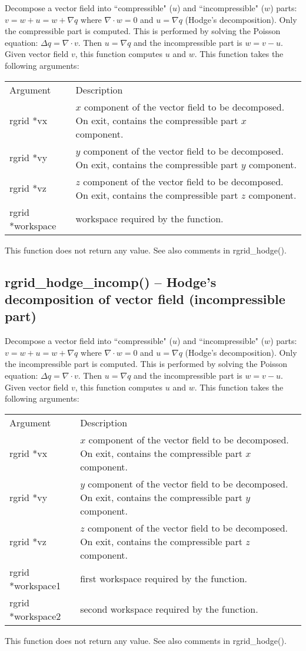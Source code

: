 \documentclass[12pt,letterpaper]{report}
\begin{document}
Decompose a vector field into ``compressible" ($u$) and ``incompressible" ($w$) parts: $v = w + u = w + \nabla q$ where $\nabla\cdot w = 0$ and $u = \nabla q$ (Hodge's decomposition). Only the compressible part is computed. This is performed by solving the Poisson equation: $\Delta q = \nabla\cdot v$. Then $u = \nabla q$ and the incompressible part is $w = v - u$. Given vector field $v$, this function computes $u$ and $w$. This function takes the following arguments:
\begin{longtable}{p{} p{}}
Argument & Description\\
\cline{1-2}
rgrid *vx & $x$ component of the vector field to be decomposed. On exit, contains the compressible part $x$ component.\\
rgrid *vy & $y$ component of the vector field to be decomposed. On exit, contains the compressible part $y$ component.\\
rgrid *vz & $z$ component of the vector field to be decomposed. On exit, contains the compressible part $z$ component.\\
rgrid *workspace & workspace required by the function.\\
\end{longtable}
\noindent
This function does not return any value. See also comments in rgrid\_hodge().

\subsection{rgrid\_hodge\_incomp() -- Hodge's decomposition of vector field (incompressible part)}

Decompose a vector field into ``compressible" ($u$) and ``incompressible" ($w$) parts: $v = w + u = w + \nabla q$ where $\nabla\cdot w = 0$ and $u = \nabla q$ (Hodge's decomposition). Only the incompressible part is computed. This is performed by solving the Poisson equation: $\Delta q = \nabla\cdot v$. Then $u = \nabla q$ and the incompressible part is $w = v - u$. Given vector field $v$, this function computes $u$ and $w$. This function takes the following arguments:
\begin{longtable}{p{} p{}}
Argument & Description\\
\cline{1-2}
rgrid *vx & $x$ component of the vector field to be decomposed. On exit, contains the compressible part $x$ component.\\
rgrid *vy & $y$ component of the vector field to be decomposed. On exit, contains the compressible part $y$ component.\\
rgrid *vz & $z$ component of the vector field to be decomposed. On exit, contains the compressible part $z$ component.\\
rgrid *workspace1 & first workspace required by the function.\\
rgrid *workspace2 & second workspace required by the function.\\
\end{longtable}
\noindent
This function does not return any value. See also comments in rgrid\_hodge().
\end{document}
